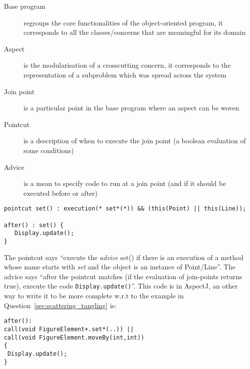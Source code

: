 \begin{solution}

\begin{description}
\item[Base program] regroups the core functionalities of the object-oriented program, it corresponds to all the classes/concerns that are meaningful for its domain
\item[Aspect] is the modularisation of a crosscutting concern, it corresponds to the representation of a subproblem which was spread across the system
\item[Join point] is a particular point in the base program where an aspect can be woven
\item[Pointcut] is a description of when to execute the join point (a boolean evaluation of some conditions)
\item[Advice] is a mean to specify code to run at a join point (and if it should be executed before or after)
\end{description}

\begin{lstlisting}
pointcut set() : execution(* set*(*)) && (this(Point) || this(Line));

after() : set() {
   Display.update();
}
\end{lstlisting}

The pointcut says \enquote{execute the \textit{advice} set() if there is an
execution of a method whose name starts with \textit{set} and the object is an
instance of Point/Line}. The advice says \enquote{after the pointcut matches (if
the evaluation of join-points returns true), execute the code
\texttt{Display.update()}}. This code is in AspectJ, an other way to write it to
be more complete w.r.t to the example in Question~\ref{sec:scattering_tangling}
is:

\begin{lstlisting}
after():
call(void FigureElement+.set*(..)) ||
call(void FigureElement.moveBy(int,int))
{
 Display.update();
}
\end{lstlisting}

\end{solution}

